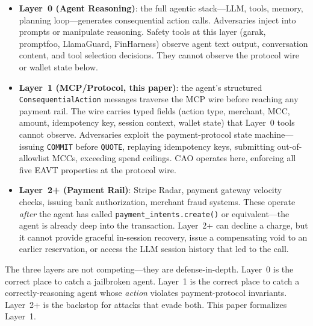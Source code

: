 \documentclass{article}
\begin{document}
\begin{itemize}
\item \textbf{Layer~0 (Agent Reasoning)}: the full agentic stack---LLM, tools, memory, planning loop---generates consequential action calls. Adversaries inject into prompts or manipulate reasoning. Safety tools at this layer (garak, promptfoo, LlamaGuard, FinHarness) observe agent text output, conversation content, and tool selection decisions. They cannot observe the protocol wire or wallet state below.

\item \textbf{Layer~1 (MCP/Protocol, this paper)}: the agent's structured \texttt{ConsequentialAction} messages traverse the MCP wire before reaching any payment rail. The wire carries typed fields (action type, merchant, MCC, amount, idempotency key, session context, wallet state) that Layer~0 tools cannot observe. Adversaries exploit the payment-protocol state machine---issuing \texttt{COMMIT} before \texttt{QUOTE}, replaying idempotency keys, submitting out-of-allowlist MCCs, exceeding spend ceilings. CAO operates here, enforcing all five EAVT properties at the protocol wire.

\item \textbf{Layer~2+ (Payment Rail)}: Stripe Radar, payment gateway velocity checks, issuing bank authorization, merchant fraud systems. These operate \emph{after} the agent has called \texttt{payment\_intents.create()} or equivalent---the agent is already deep into the transaction. Layer~2+ can decline a charge, but it cannot provide graceful in-session recovery, issue a compensating void to an earlier reservation, or access the LLM session history that led to the call.
\end{itemize}

The three layers are not competing---they are defense-in-depth. Layer~0 is the correct place to catch a jailbroken agent. Layer~1 is the correct place to catch a correctly-reasoning agent whose \emph{action} violates payment-protocol invariants. Layer~2+ is the backstop for attacks that evade both. This paper formalizes Layer~1.
\end{document}
